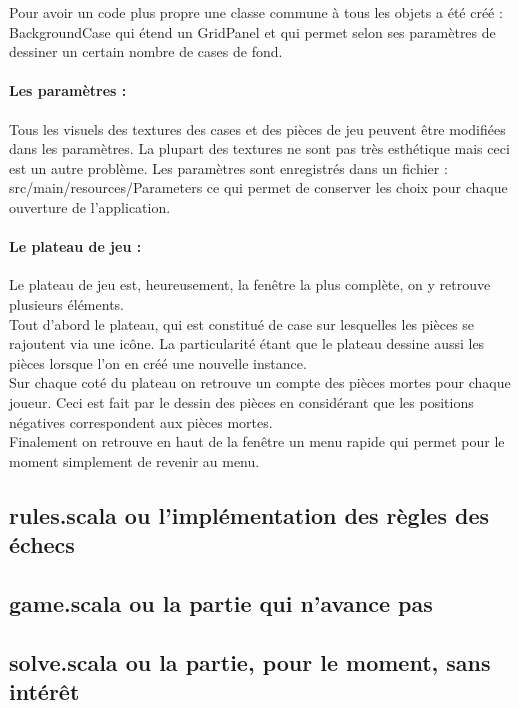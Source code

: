 \documentclass[a4paper]{article}
\begin{document}
Pour avoir un code plus propre une classe commune à tous les objets a été créé : BackgroundCase qui étend un GridPanel et qui permet selon ses paramètres de dessiner un certain nombre de cases de fond. 

\paragraph{Les paramètres :}Tous les visuels des textures des cases et des pièces de jeu peuvent être modifiées dans les paramètres. La plupart des textures ne sont pas très esthétique mais ceci est un autre problème. Les paramètres sont enregistrés dans un fichier : src/main/resources/Parameters ce qui permet de conserver les choix pour chaque ouverture de l'application. 

\paragraph{Le plateau de jeu :}Le plateau de jeu est, heureusement, la fenêtre la plus complète, on y retrouve plusieurs éléments. \\

Tout d'abord le plateau, qui est constitué de case sur lesquelles les pièces se rajoutent via une icône. La particularité étant que le plateau dessine aussi les pièces lorsque l'on en créé une nouvelle instance. \\

Sur chaque coté du plateau on retrouve un compte des pièces mortes pour chaque joueur. Ceci est fait par le dessin des pièces en considérant que les positions négatives correspondent aux pièces mortes. \\

Finalement on retrouve en haut de la fenêtre un menu rapide qui permet pour le moment simplement de revenir au menu. 

\subsection{rules.scala ou l'implémentation des règles des échecs}

\subsection{game.scala ou la partie qui n'avance pas}

\subsection{solve.scala ou la partie, pour le moment, sans intérêt}
\end{document}
